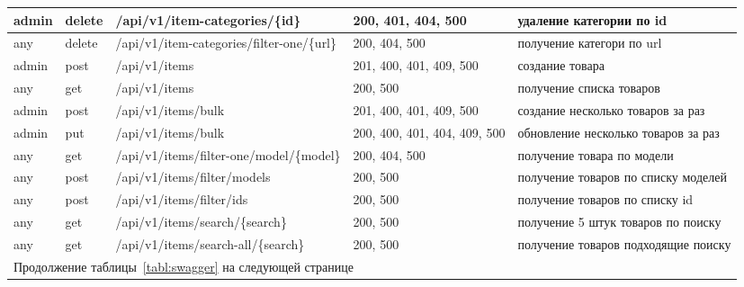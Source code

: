 \begin{sidewaystable}
\begin{tabular}{|p{1cm}|p{1cm}|p{8.5cm}|p{4.8cm}|p{8cm}|}
        admin & delete & /api/v1/item-categories/\{id\} & 200, 401, 404, 500 & удаление категории по id \\ \hline 
        any & delete & /api/v1/item-categories/filter-one/\{url\} & 200, 404, 500 & получение категори по url \\ \hline 
        admin & post & /api/v1/items & 201, 400, 401, 409, 500 & создание товара \\ \hline 
        any & get & /api/v1/items & 200, 500 & получение списка товаров \\ \hline 
        admin & post & /api/v1/items/bulk & 201, 400, 401, 409, 500 & создание несколько товаров за раз \\ \hline 
        admin & put & /api/v1/items/bulk & 200, 400, 401, 404, 409, 500 & обновление несколько товаров за раз \\ \hline 
        any & get & /api/v1/items/filter-one/model/\{model\} & 200, 404, 500 & получение товара по модели \\ \hline 
        any & post & /api/v1/items/filter/models & 200, 500 & получение товаров по списку моделей \\ \hline
        any & post & /api/v1/items/filter/ids & 200, 500 & получение товаров по списку id \\ \hline  
        any & get & /api/v1/items/search/\{search\} & 200, 500 & получение 5 штук товаров по поиску \\ \hline 
        any & get & /api/v1/items/search-all/\{search\} & 200, 500 & получение товаров подходящие поиску \\ \hline 
        \multicolumn{5}{l}{Продолжение таблицы~\ref{tabl:swagger} на следующей странице}
    \end{tabular}
\end{sidewaystable}
